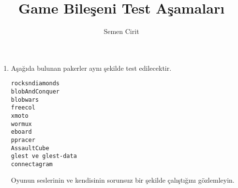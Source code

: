 \documentclass[a4paper,10pt]{article}
\title{Game Bileşeni Test Aşamaları}
\author{Semen Cirit}
\begin{document}
\maketitle

\begin{enumerate}
\item Aşağıda bulunan pakerler aynı şekilde test edilecektir. 
\begin{verbatim}
rocksndiamonds 
blobAndConquer
blobwars
freecol
xmoto
wormux
eboard
ppracer
AssaultCube
glest ve glest-data
connectagram
\end{verbatim}

Oyunun seslerinin ve kendisinin sorunsuz bir şekilde çalıştığını gözlemleyin.	
\end{enumerate}
\end{document}
